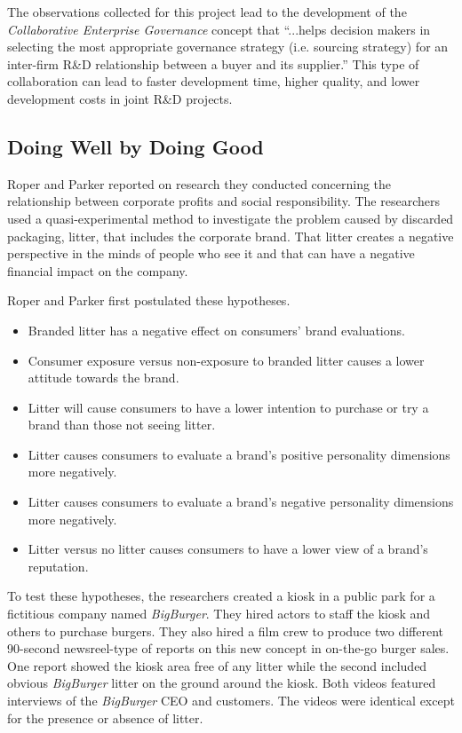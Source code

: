 The observations collected for this project lead to the development of the \textit{Collaborative Enterprise Governance} concept that ``...helps  decision  makers  in  selecting  the  most  appropriate governance  strategy  (i.e.  sourcing  strategy)  for  an  inter-firm  R\&D  relationship  between  a buyer and its supplier.'' This type of collaboration can lead to faster development time, higher quality, and lower development costs in joint R\&D projects. 

\subsection{Doing Well by Doing Good}

Roper and Parker reported on research they conducted concerning the relationship between corporate profits and social responsibility\cite{roper2013doing}. The researchers used a quasi-experimental method to investigate the problem caused by discarded packaging, litter, that includes the corporate brand. That litter creates a negative perspective in the minds of people who see it and that can have a negative financial impact on the company. 

Roper and Parker first postulated these hypotheses.

\begin{itemize}
	\item Branded litter has a negative effect on consumers' brand 	evaluations.
	\item Consumer exposure versus non-exposure to branded litter causes a lower attitude towards the brand.
	\item Litter will cause consumers to have a lower intention to purchase or try a brand than those not seeing litter.
	\item Litter causes consumers to evaluate a brand's positive personality	dimensions more negatively.
	\item Litter causes consumers to evaluate a brand's negative personality	dimensions more negatively.
	\item Litter versus no litter causes consumers to have a lower view of	a brand's reputation.
\end{itemize}

To test these hypotheses, the researchers created a kiosk in a public park for a fictitious company named \textit{BigBurger}. They hired actors to staff the kiosk and others to purchase burgers. They also hired a film crew to produce two different 90-second newsreel-type of reports on this new concept in on-the-go burger sales. One report showed the kiosk area free of any litter while the second included obvious \textit{BigBurger} litter on the ground around the kiosk. Both videos featured interviews of the \textit{BigBurger} CEO and customers. The videos were identical except for the presence or absence of litter.

